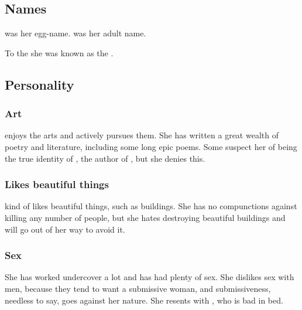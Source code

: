 \subsection{Names}
\Cryocas was her egg-name.
\Nzessuacrith was her adult name. 

To the \Ortaicans she was known as the \taortha {}. 









\subsection{Personality}





\subsubsection{Art}
\Nzessuacrith{} enjoys the arts and actively pursues them. 
She has written a great wealth of poetry and literature, including some long epic poems. 
Some suspect her of being the true identity of , the author of \emph{}, but she denies this. 





\subsubsection{Likes beautiful things}
\Nzessuacrith{} kind of likes beautiful things, such as buildings. 
She has no compunctions against killing any number of people, but she hates destroying beautiful buildings and will go out of her way to avoid it.





\subsubsection{Sex}
She has worked undercover a lot and has had plenty of sex. 
She dislikes sex with \human{} men, because they tend to want a submissive woman, and submissiveness, needless to say, goes against her \draconic{} nature. 
She resents  with , who is bad in bed. 

